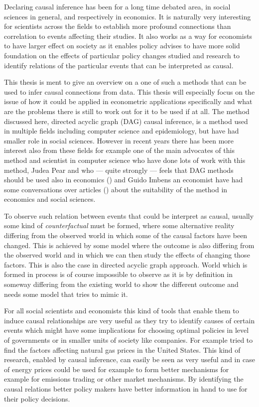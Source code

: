 \documentclass[main=english,12pt,a4paper,pdftex,econ,utf8]{aaltothesis}
\begin{document}
Declaring causal inference has been for a long time debated area, in social sciences in general, and respectively in economics. It is naturally very interesting for scientists across the fields to establish more profound connections than correlation to events affecting their studies. It also works as a way for economists to have larger effect on society as it enables policy advises to have more solid foundation on the effects of particular policy changes studied and research to identify relations of the particular events that can be interpreted as causal.

This thesis is ment to give an overview on a one of such a methods that can be used to infer causal connections from data. This thesis will especially focus on the issue of how it could be applied in econometric applications specifically and what are the problems there is still to work out for it to be used if at all. The method discussed here, directed acyclic graph (DAG) causal inference, is a method used in multiple fields including computer science and epidemiology, but have had smaller role in social sciences. However in recent years there has been more interest also from these fields for example one of the main advocates of this method and scientist in computer science who have done lots of work with this method, Judea Pear and who --- quite strongly --- feels that DAG methods should be used also in economics (\cite{pearl_2014}) and Guido Imbens an economist have had some conversations over articles (\cite{Imbens2014}) about the suitability of the method in economics and social sciences.

To observe such relation between events that could be interpret as causal, usually some kind of \textit{counterfactual} must be formed, where some alternative reality differing from the observed world in which some of the causal factors have been changed. This is achieved by some model where the outcome is also differing from the observed world and in which we can then study the effects of changing those factors. This is also the case in directed acyclic graph approach. World which is formed in process is of course impossible to observe as it is by definition in someway differing from the existing world to show the different outcome and needs some model that tries to mimic it.

For all social scientists and economists this kind of tools that enable them to induce causal relationships are very useful as they try to identify causes of certain events which might have some implications for choosing optimal policies in level of governments or in smaller units of society like companies. For example \cite{Ji2018} tried to find the factors affecting natural gas prices in the United States. This kind of research, enabled by causal inference, can easily be seen as very useful and in case of energy prices could be used for example to form better mechanisms for example for emissions trading or other market mechanisms. By identifying the causal relations better policy makers have better information in hand to use for their policy decisions. 
\end{document}
